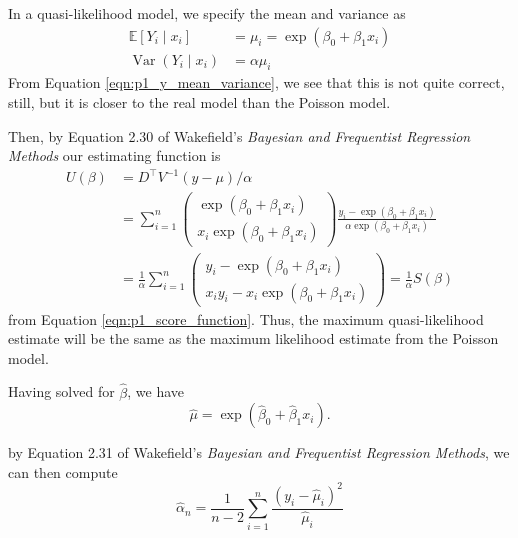 \documentclass[letterpaper,11pt]{article}
\begin{document}
\begin{enumerate}
\begin{description}
    In a quasi-likelihood model, we specify the mean and variance as
    \begin{align}
      \mathbb{E}\left[
      Y_i
      \mid x_i
      \right]
      &= \mu_i = \exp\left(\beta_0 + \beta_1x_i\right) \nonumber\\
      \operatorname{Var}\left(Y_i \mid x_i\right)
      &= \alpha \mu_i
      \label{eqn:p1_y_quasi_mean_variance}
    \end{align}
    From Equation \ref{eqn:p1_y_mean_variance}, we see that this is not quite
    correct, still, but it is closer to the real model than the Poisson model.

    Then, by Equation 2.30 of Wakefield's \emph{Bayesian and Frequentist
      Regression Methods} our estimating function is
    \begin{align}
      U\left(\beta\right)
      &= D^\intercal V^{-1}\left(y - \mu\right)/\alpha \nonumber\\
      &= \sum_{i=1}^n\begin{pmatrix}
        \exp\left(\beta_0 + \beta_1x_i\right) \\
        x_i\exp\left(\beta_0 + \beta_1x_i\right)
      \end{pmatrix}
      \frac{y_i - \exp\left(\beta_0 + \beta_1x_i\right)}{\alpha\exp\left(\beta_0 + \beta_1x_i\right)}
      \nonumber\\
      &= \frac{1}{\alpha}\sum_{i=1}^n\begin{pmatrix}
        y_i - \exp\left(\beta_0 + \beta_1x_i\right) \\
        x_iy_i - x_i\exp\left(\beta_0 + \beta_1x_i\right)
      \end{pmatrix} = \frac{1}{\alpha}S\left(\beta\right)
      \label{eqn:p1_quasi_likelihood_score_function}
    \end{align}
    from Equation \ref{eqn:p1_score_function}. Thus, the maximum
    quasi-likelihood estimate will be the same as the maximum likelihood
    estimate from the Poisson model.

    Having solved for $\hat{\beta}$, we have
    \begin{equation}
      \hat{\mu} = \exp\left(\hat{\beta}_0 + \hat{\beta}_1x_i\right).
      \label{eqn:p1_mu_hat}
    \end{equation}

    by Equation 2.31 of Wakefield's \emph{Bayesian and Frequentist Regression
      Methods}, we can then compute
    \begin{equation}
      \hat{\alpha}_n
      = \frac{1}{n-2}\sum_{i=1}^n \frac{\left(y_i - \hat{\mu}_i\right)^2}{\hat{\mu}_i}
      \label{eqn:p1_alpha_hat}
    \end{equation}


\end{description}
\end{enumerate}
\end{document}
